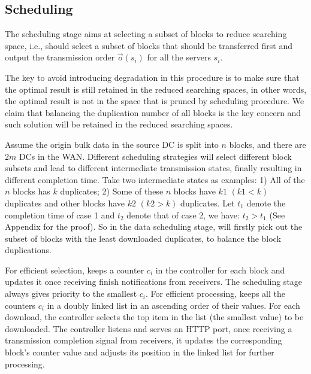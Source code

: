 
\subsection{Scheduling}
\label{subsec:logic:scheduling}

The scheduling stage aims at selecting a subset of blocks to reduce searching space, i.e., \name should select a subset of blocks that should be transferred first and output the transmission order $\overrightarrow{o}(s_i)$ for all the servers $s_i$.

The key to avoid introducing degradation in this procedure is to make sure that the optimal result is still retained in the reduced searching spaces, in other words, the optimal result is not in the space that is pruned by scheduling procedure. We claim that balancing the duplication number of all blocks is the key concern and such solution will be retained in the reduced searching spaces.

Assume the origin bulk data in the source DC is split into $n$ blocks, and there are $2m$ DCs in the WAN. Different scheduling strategies will select different block subsets and lead to different intermediate transmission states, finally resulting in different completion time. Take two intermediate states as examples: 1) All of the $n$ blocks has $k$ duplicates; 2) Some of these $n$ blocks have $k1$ $(k1<k)$ duplicates and other blocks have $k2$ $(k2>k)$ duplicates. Let $t_1$ denote the completion time of case 1 and $t_2$ denote that of case 2, we have: $t_2 > t_1$ (See Appendix for the proof). So in the data scheduling stage, \name will firstly pick out the subset of blocks with the least downloaded duplicates, to balance the block duplications.

For efficient selection, \name keeps a counter $c_i$ in the controller for each block and updates it once receiving finish notifications from receivers. The scheduling stage always gives priority to the smallest $c_i$. For efficient processing, \name keeps all the counters $c_i$ in a doubly linked list in an ascending order of their values. For each download, the controller selects the top item in the list (the smallest value) to be downloaded. The controller listens and serves an HTTP port, once receiving a transmission completion signal from receivers, it updates the corresponding block's counter value and adjusts its position in the linked list for further processing.

